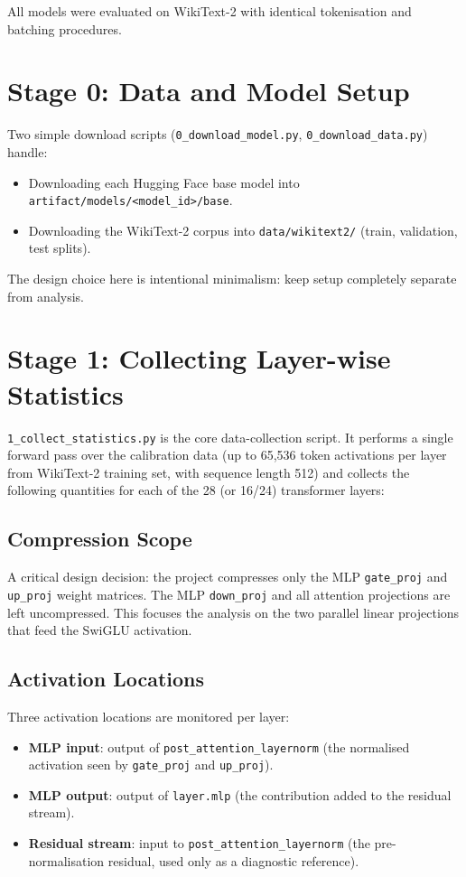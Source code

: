 \documentclass[11pt]{article}
\begin{document}
\noindent All models were evaluated on WikiText-2 with identical tokenisation and batching procedures.

\section{Stage 0: Data and Model Setup}

Two simple download scripts (\texttt{0\_download\_model.py}, \texttt{0\_download\_data.py}) handle:
\begin{itemize}
    \item Downloading each Hugging Face base model into \texttt{artifact/models/<model\_id>/base}.
    \item Downloading the WikiText-2 corpus into \texttt{data/wikitext2/} (train, validation, test splits).
\end{itemize}
The design choice here is intentional minimalism: keep setup completely separate from analysis.

\section{Stage 1: Collecting Layer-wise Statistics}
\label{sec:stage1}

\texttt{1\_collect\_statistics.py} is the core data-collection script.  It performs a single forward pass over the calibration data (up to 65,536 token activations per layer from WikiText-2 training set, with sequence length 512) and collects the following quantities for each of the 28 (or 16/24) transformer layers:

\subsection{Compression Scope}
A critical design decision: the project compresses only the MLP \texttt{gate\_proj} and \texttt{up\_proj} weight matrices.  The MLP \texttt{down\_proj} and all attention projections are left uncompressed.  This focuses the analysis on the two parallel linear projections that feed the SwiGLU activation.

\subsection{Activation Locations}
Three activation locations are monitored per layer:
\begin{itemize}
    \item \textbf{MLP input}: output of \texttt{post\_attention\_layernorm} (the normalised activation seen by \texttt{gate\_proj} and \texttt{up\_proj}).
    \item \textbf{MLP output}: output of \texttt{layer.mlp} (the contribution added to the residual stream).
    \item \textbf{Residual stream}: input to \texttt{post\_attention\_layernorm} (the pre-normalisation residual, used only as a diagnostic reference).
\end{itemize}
\end{document}
